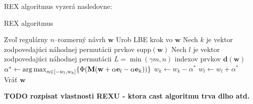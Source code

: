 REX algoritmus vyzerá nasledovne:

\begin{algorithm}[H]
	\caption{REX algoritmus \cite{rex_harman}}
	\label{rex}
	\begin{algorithmic}[1]
		\State Zvoľ regulárny $n$--rozmerný návrh $\mathbf w$
			\State Urob LBE krok vo $\mathbf w$
			\State Nech $k$ je vektor zodpovedajúci náhodnej permutácii prvkov supp$(\mathbf w)$
			\State Nech $l$ je vektor zodpovedajúci náhodnej permutácii $L=\min(\gamma m, n)$ indexov prvkov $\mathbf {d(w)}$
					\State $\alpha^* \leftarrow \operatorname*{arg\,max}_{\alpha \in [-w_l, w_k]} \{ \Phi(\mathbf M(\mathbf w+\alpha \mathbf e_l -\alpha \mathbf e_k))\}$
						\State $w_k \leftarrow w_k - \alpha^*$
						\State $w_l \leftarrow w_l + \alpha^*$
					\EndIf
				\EndFor
			\EndFor
		\EndWhile
		\State Vráť $\mathbf w$
	\end{algorithmic}
\end{algorithm}

\textbf{TODO rozpisat vlastnosti REXU - ktora cast algoritmu trva dlho atd.}